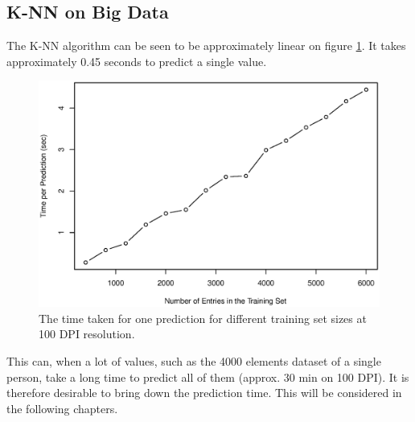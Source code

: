 \subsection{K-NN on Big Data}
The K-NN algorithm can be seen to be approximately linear on figure \ref{fig:predictionTimeVStrainSize}.
It takes approximately 0.45 seconds to predict a single value.

\begin{figure}[H]
\centering
\includegraphics[width = 0.95 \textwidth]{graphics/graph_timeVSppl}
\caption{The time taken for one prediction for different training set sizes at 100 DPI resolution.}
\label{fig:predictionTimeVStrainSize}
\end{figure}

This can, when a lot of values, such as the 4000 elements dataset of a single person, take a long time to predict all of them (approx. 30 min on 100 DPI).
It is therefore desirable to bring down the prediction time.
This will be considered in the following chapters.
